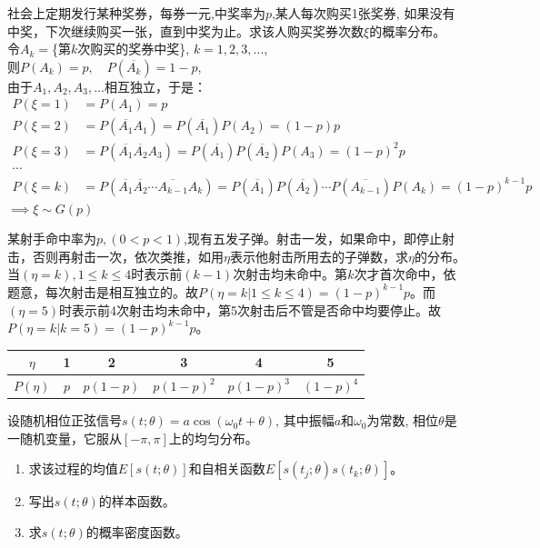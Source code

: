 \begin{frame}
\begin{example}
	社会上定期发行某种奖券，每券一元,中奖率为$p$,某人每次购买1张奖券, 如果没有中奖，下次继续购买一张，直到中奖为止。求该人购买奖券次数$\xi$的概率分布。\\
	令$A_k=$\{第$k$次购买的奖券中奖\}, $k=1,2,3,...$, \\
	则$P(A_k)=p,\quad P(\overline{A_k})=1-p$, \\
	由于$A_1,A_2,A_3,\dots$相互独立，于是：
	\begin{align*}
	P(\xi=1)&=P(A_1)=p\\
	P(\xi=2)&=P(\overline{A_1}A_1)=P(\overline{A_1})P(A_2)=(1-p)p\\
	P(\xi=3)&=P(\overline{A_1}\overline{A_2}A_3)=P(\overline{A_1})P(\overline{A_2})P(A_3)=(1-p)^{2}p\\
	\cdots\\
	P(\xi=k)&=P(\overline{A_1}\overline{A_2}\cdots\overline{A_{k-1}}A_k)=P(\overline{A_1})P(\overline{A_2})\cdots P(\overline{A_{k-1}})P(A_k)=(1-p)^{k-1}p
	\end{align*}
	$\implies \xi\sim G(p)$
\end{example}
\end{frame}

\begin{frame}
\begin{example}
	某射手命中率为$p,(0<p<1)$,现有五发子弹。射击一发，如果命中，即停止射击，否则再射击一次，依次类推，如用$\eta$表示他射击所用去的子弹数，求$\eta$的分布。\\
	当$(\eta=k),1\le k\le 4$时表示前$(k-1)$次射击均未命中。第$k$次才首次命中，依题意，每次射击是相互独立的。故$P(\eta=k| 1\le k\le 4)=(1-p)^{k-1}p$。而$(\eta=5)$时表示前4次射击均未命中，第5次射击后不管是否命中均要停止。故$P(\eta=k|k=5)=(1-p)^{k-1}p$。\\
	\begin{tabular}{|c|c|c|c|c|c|}
		\hline 
		$\eta$ & 1 & 2 & 3 & 4 & 5\\ 
		\hline 
		$P(\eta)$ & $p$ & $p(1-p)$ & $p(1-p)^2$ & $p(1-p)^3$  & $(1-p)^4$ \\ 
		\hline 
	\end{tabular} 
\end{example}
\end{frame}

\begin{frame}
\begin{example}
	设随机相位正弦信号$s(t; \theta)=a\cos(\omega_0 t+\theta)$, 其中振幅$a$和$\omega_0$为常数, 相位$\theta$是一随机变量，它服从$[-\pi,\pi]$上的均匀分布。
	\begin{enumerate}
		\item 求该过程的均值$E[s(t; \theta)]$和自相关函数$E[s(t_j; \theta)s(t_k; \theta)]$。
		\item 写出$s(t;\theta)$的样本函数。
		\item 求$s(t;\theta)$的概率密度函数。
	\end{enumerate}
\end{example}
\end{frame}


